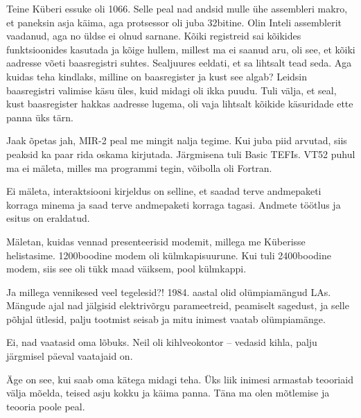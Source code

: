 Teine Küberi essuke oli 1066. Selle peal nad andsid mulle ühe
assembleri makro, et paneksin asja käima, aga protsessor oli juba 32bitine. Olin Inteli assemblerit vaadanud, aga no üldse ei olnud 
sarnane. Kõiki registreid sai kõikides funktsioonides kasutada ja kõige 
hullem, millest ma ei saanud aru, oli see, et kõiki aadresse võeti 
baasregistri suhtes. Sealjuures eeldati, et sa lihtsalt 
tead seda. Aga kuidas teha kindlaks, milline on baasregister ja kust see 
algab? Leidsin baasregistri valimise käsu üles, kuid 
midagi oli ikka puudu. Tuli välja, et seal, kust baasregister hakkas aadresse 
lugema, oli vaja lihtsalt kõikide käsuridade ette panna üks 
tärn.


Jaak õpetas jah, MIR-2 peal me mingit nalja 
tegime. Kui juba piid arvutad, siis peaksid ka paar rida oskama kirjutada. Järgmisena tuli Basic TEFIs. VT52 puhul ma ei mäleta, 
milles ma programmi tegin, võibolla oli Fortran. 


Ei mäleta, interaktsiooni kirjeldus on selline, et saadad 
terve 
andmepaketi korraga minema ja saad terve andmepaketi korraga tagasi. Andmete 
töötlus ja esitus on eraldatud. 


Mäletan, kuidas vennad presenteerisid modemit, millega me Küberisse 
helistasime. 1200boodine modem oli külmkapisuurune. Kui tuli 2400boodine modem, siis see oli tükk maad väiksem, pool külmkappi.

Ja millega vennikesed veel tegelesid?! 1984. aastal olid olümpiamängud LAs. Mängude 
ajal nad jälgisid elektrivõrgu parameetreid, peamiselt sagedust, ja selle põhjal 
ütlesid, palju tootmist seisab ja mitu inimest vaatab olümpiamänge. 


Ei, nad vaatasid oma lõbuks. Neil oli kihlveokontor – vedasid kihla, palju järgmisel päeval 
vaatajaid on.


Äge on see, kui saab oma kätega midagi teha. Üks liik inimesi armastab teooriaid 
välja mõelda, teised asju kokku 
ja käima panna. Täna ma olen 
mõtlemise ja teooria poole peal.


